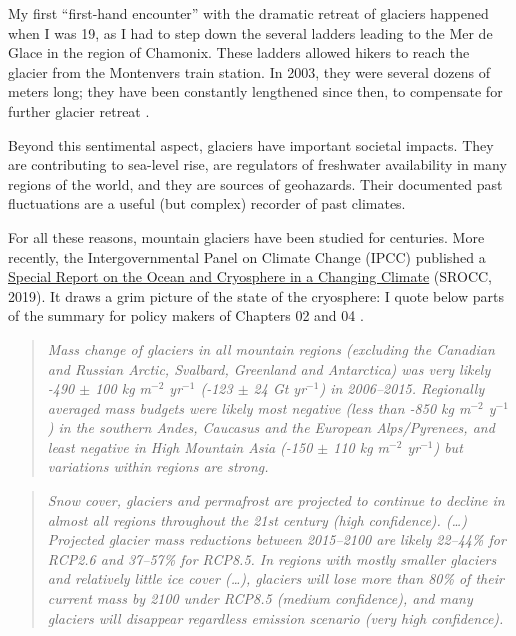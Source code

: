 
My first “first-hand encounter” with the dramatic retreat of glaciers happened when I was 19, as I had to step down the
several ladders leading to the Mer de Glace in the region of Chamonix. These ladders allowed hikers to reach the glacier
from the Montenvers train station. In 2003, they were several dozens of meters long; they have been constantly
lengthened since then, to compensate for further glacier retreat \citep{Mourey2017}.

Beyond this sentimental aspect, glaciers have important societal impacts. They are contributing to sea-level rise, are
regulators of freshwater availability in many regions of the world, and they are sources of geohazards. Their documented
past fluctuations are a useful (but complex) recorder of past climates.

For all these reasons, mountain glaciers have been studied for centuries. More recently, the Intergovernmental Panel on
Climate Change (IPCC) published
a \href{https://www.ipcc.ch/srocc/}{Special Report on the Ocean and Cryosphere in a Changing Climate} (SROCC, 2019). It draws
a grim picture of the state of the cryosphere: I quote below parts of the summary for policy makers of Chapters 02
\citep{Hock2019a} and 04 \citep{Oppenheimer2019}.

\begin{quote}
\textit{Mass change of glaciers in all mountain regions (excluding the Canadian and Russian Arctic, Svalbard, Greenland and Antarctica) was very likely -490 \(\pm\) 100 kg m\(^{-2}\) yr\(^{-1}\) (-123 \(\pm\) 24 Gt yr\(^{-1}\)) in 2006--2015. Regionally averaged mass budgets were likely most negative (less than -850 kg m\(^{-2}\) y\(^{-1}\)) in the southern Andes, Caucasus and the European Alps/Pyrenees, and least negative in High Mountain Asia (-150 \(\pm\) 110 kg m\(^{-2}\) yr\(^{-1}\)) but variations within regions are strong.}
\end{quote}

\begin{quote}
\textit{Snow cover, glaciers and permafrost are projected to continue to decline in almost all regions throughout the 21st century (high confidence). (…) Projected glacier mass reductions between 2015--2100 are likely 22--44\% for RCP2.6 and 37--57\% for RCP8.5. In regions with mostly smaller glaciers and relatively little ice cover (…), glaciers will lose more than 80\% of their current mass by 2100 under RCP8.5 (medium confidence), and many glaciers will disappear regardless emission scenario (very high confidence).}
\end{quote}

